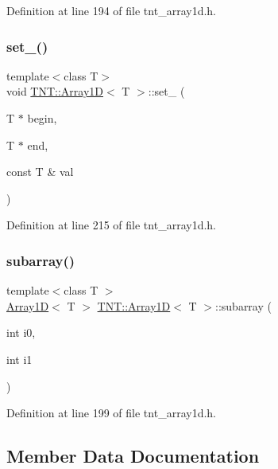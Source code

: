Definition at line 194 of file tnt\+\_\+array1d.\+h.

\mbox{\label{classTNT_1_1Array1D_a313ac1ebbd19dcb33c6e9989d50ba517}} 
\subsubsection{\texorpdfstring{set\+\_\+()}{set\_()}}
{\footnotesize\ttfamily template$<$class T$>$ \\
void \hyperlink{classTNT_1_1Array1D}{T\+N\+T\+::\+Array1D}$<$ T $>$\+::set\+\_\+ (\begin{DoxyParamCaption}\item[{T $\ast$}]{begin,  }\item[{T $\ast$}]{end,  }\item[{const T \&}]{val }\end{DoxyParamCaption})\hspace{0.3cm}{\ttfamily [private]}}



Definition at line 215 of file tnt\+\_\+array1d.\+h.

\mbox{\label{classTNT_1_1Array1D_a47447dc28a1956e5018953f806192330}} 
\subsubsection{\texorpdfstring{subarray()}{subarray()}}
{\footnotesize\ttfamily template$<$class T $>$ \\
\hyperlink{classTNT_1_1Array1D}{Array1D}$<$ T $>$ \hyperlink{classTNT_1_1Array1D}{T\+N\+T\+::\+Array1D}$<$ T $>$\+::subarray (\begin{DoxyParamCaption}\item[{int}]{i0,  }\item[{int}]{i1 }\end{DoxyParamCaption})\hspace{0.3cm}{\ttfamily [inline]}}



Definition at line 199 of file tnt\+\_\+array1d.\+h.



\subsection{Member Data Documentation}
\mbox{\label{classTNT_1_1Array1D_adb0ea5432404274e9d831215db7a5c8a}} 
